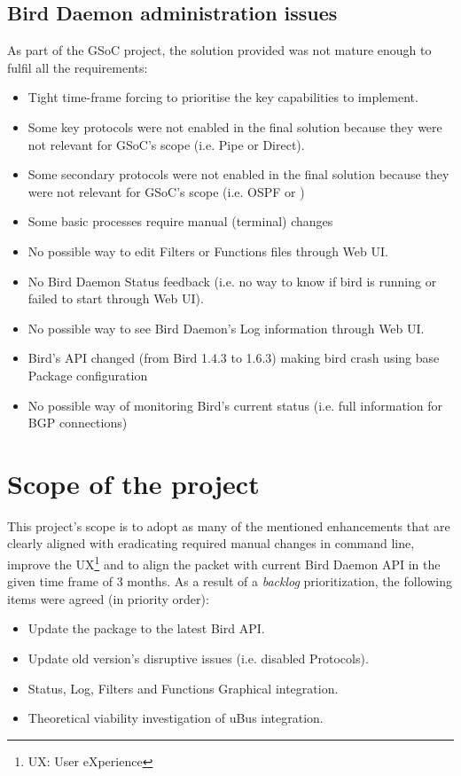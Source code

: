 \subsection{Bird Daemon administration issues}
\label{subsec:bdai}
As part of the GSoC project, the solution provided was not mature enough to fulfil all the requirements:
\begin{itemize}
    \item Tight time-frame forcing to prioritise the key capabilities to implement.
    \item Some key protocols were not enabled in the final solution because they were not relevant for GSoC's scope (i.e. Pipe or Direct).
    \item Some secondary protocols were not enabled in the final solution because they were not relevant for GSoC's scope (i.e. OSPF or )
    \item Some basic processes require manual (terminal) changes
    \item No possible way to edit Filters or Functions files through Web UI.
    \item No Bird Daemon Status feedback (i.e. no way to know if bird is running or failed to start through Web UI).
    \item No possible way to see Bird Daemon's Log information through Web UI.
    \item Bird's API changed (from Bird 1.4.3 to 1.6.3) making bird crash using base Package configuration
    \item No possible way of monitoring Bird's current status (i.e. full information for BGP connections)
\end{itemize}
\section{Scope of the project}
\label{sec:sotp}
This project's scope is to adopt as many of the mentioned enhancements that are clearly aligned with eradicating required manual changes in command line, improve the UX\footnote{UX: User eXperience} and to align the packet with current Bird Daemon API in the given time frame of 3 months. As a result of a \textit{backlog} prioritization, the following items were agreed (in priority order):

\begin{itemize}
    \item Update the package to the latest Bird API.
    \item Update old version's disruptive issues (i.e. disabled Protocols).
    \item Status, Log, Filters and Functions Graphical integration.
    \item Theoretical viability investigation of uBus integration.
\end{itemize}



